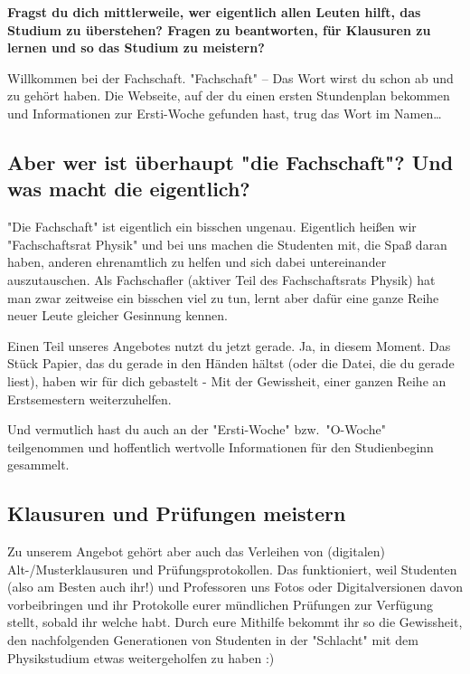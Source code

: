 \begin{multicols}{2}
\renewcommand{\fibelsubsectionpre}{\fibelsubsubsectionpre}
\renewcommand{\fibelsubsectionpost}{\fibelsubsubsectionpost}
\textbf{Fragst du dich mittlerweile, wer eigentlich allen Leuten hilft, das Studium zu überstehen? Fragen zu beantworten, für Klausuren zu lernen und so das Studium zu meistern?}

Willkommen bei der Fachschaft. "Fachschaft" -- Das Wort wirst du schon ab und zu gehört haben. Die Webseite, auf der du einen ersten Stundenplan bekommen und Informationen zur Ersti-Woche gefunden hast, trug das Wort im Namen\dots

\subsection*{Aber wer ist überhaupt "die Fachschaft"? Und was macht die eigentlich?}
"Die Fachschaft" ist eigentlich ein bisschen ungenau. Eigentlich heißen wir "Fachschaftsrat Physik" und bei uns machen die Studenten mit, die Spaß daran haben, anderen ehrenamtlich zu helfen und sich dabei untereinander auszutauschen. Als Fachschafler (aktiver Teil des Fachschaftsrats Physik) hat man zwar zeitweise ein bisschen viel zu tun, lernt aber dafür eine ganze Reihe neuer Leute gleicher Gesinnung kennen.

Einen Teil unseres Angebotes nutzt du jetzt gerade. Ja, in diesem Moment. Das Stück Papier, das du gerade in den Händen hältst (oder die Datei, die du gerade liest), haben wir für dich gebastelt - Mit der Gewissheit, einer ganzen Reihe an Erstsemestern weiterzuhelfen.

Und vermutlich hast du auch an der "Ersti-Woche" bzw.\ "O-Woche" teilgenommen und hoffentlich wertvolle Informationen für den Studienbeginn gesammelt.

\subsection*{Klausuren und Prüfungen meistern}
Zu unserem Angebot gehört aber auch das Verleihen von (digitalen) Alt-/Musterklausuren und Prüfungsprotokollen. Das funktioniert, weil Studenten (also am Besten auch ihr!) und Professoren uns Fotos oder Digitalversionen davon vorbeibringen und ihr Protokolle eurer mündlichen Prüfungen zur Verfügung stellt, sobald ihr welche habt. Durch eure Mithilfe bekommt ihr so die Gewissheit, den nachfolgenden Generationen von Studenten in der "Schlacht" mit dem Physikstudium etwas weitergeholfen zu haben :)


\end{multicols}
